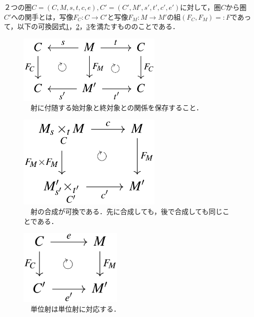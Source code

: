 \documentclass[uplatex, 12pt, a4paper, dvipdfmx]{jsarticle}
\begin{document}
\begin{shadebox}\begin{definition}[関手]
    ２つの圏$C=(C,M,s,t,c,e),C'=(C',M',s',t',c',e')$に対して，圏$C$から圏$C'$への関手とは，写像$F_C:C\longrightarrow C'$と写像$F_M:M\longrightarrow M'$の組$(F_C,F_M)=:F$であって，以下の可換図式\ref{cd-5}，\ref{cd-6}，\ref{cd-7}を満たすもののことである．
\end{definition}\end{shadebox}

\begin{figure}[ht]\begin{center} \caption{\label{cd-5}　射に付随する始対象と終対象との関係を保存すること．}
    \includegraphics[width=7cm]{cd-5.png}
\end{center}\end{figure}

\begin{figure}[ht]\begin{center} \caption{\label{cd-6}　射の合成が可換である．先に合成しても，後で合成しても同じことである．}
    \includegraphics[width=7cm]{cd-6.png}
\end{center}\end{figure}

\begin{figure}[ht]\begin{center} \caption{\label{cd-7}　単位射は単位射に対応する．}
    \includegraphics[width=5cm]{cd-7.png}
\end{center}\end{figure}
\end{document}
